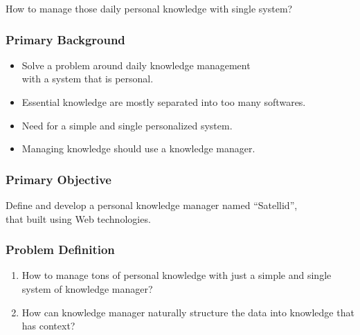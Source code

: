 \documentclass[10pt, compress]{beamer}
\begin{document}

\begin{frame}[fragile]
  \centering

  How to manage those \alert{daily personal knowledge} with \alert{single system}?

\end{frame}


\begin{frame}[fragile]
  \frametitle{Primary Background}

  \begin{itemize} \itemsep0pt
    \item Solve a problem around \alert{daily knowledge management} \\
          with a system that is personal.
    \item Essential knowledge are mostly separated into too many softwares.
    \item Need for a simple and single personalized system.
    \item Managing knowledge should use a \alert{knowledge manager}.
  \end{itemize}

\end{frame}


\begin{frame}[fragile]
  \frametitle{Primary Objective}

  Define and develop a personal knowledge manager named \alert{``Satellid''},\\
  that built using Web technologies.

\end{frame}


\begin{frame}[fragile]
  \frametitle{Problem Definition}

  \begin{enumerate}
    \item How to manage tons of personal knowledge with just a simple and single system of knowledge manager?
    \item How can knowledge manager naturally structure the data into knowledge that has context?
  \end{enumerate}

\end{frame}
\end{document}
